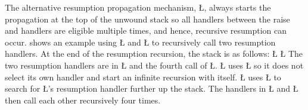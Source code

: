\documentclass[openright,twoside]{report}
\begin{document}
The alternative resumption propagation mechanism, \LGinlinetrue\LGbegin\lgrinde\L{}\endlgrinde\LGend{}, always starts the propagation at the top of the unwound stack so all handlers between the raise and handlers are eligible multiple times, and hence, recursive resumption can occur.
 shows an example using \LGinlinetrue\LGbegin\lgrinde\L{}\endlgrinde\LGend{} and \LGinlinetrue\LGbegin\lgrinde\L{}\endlgrinde\LGend{} to recursively call two resumption handlers.
At the end of the resumption recursion, the stack is as follows:
\LGinlinefalse\LGbegin\lgrinde
\L{}
\L{\LB{}}
\endlgrinde\LGend
The two resumption handlers are in \LGinlinetrue\LGbegin\lgrinde\L{}\endlgrinde\LGend{} and the fourth call of \LGinlinetrue\LGbegin\lgrinde\L{}\endlgrinde\LGend{}.
\LGinlinetrue\LGbegin\lgrinde\L{}\endlgrinde\LGend{} uses \LGinlinetrue\LGbegin\lgrinde\L{}\endlgrinde\LGend{} so it does not select its own handler and start an infinite recursion with itself.
\LGinlinetrue\LGbegin\lgrinde\L{}\endlgrinde\LGend{} uses \LGinlinetrue\LGbegin\lgrinde\L{}\endlgrinde\LGend{} to search for \LGinlinetrue\LGbegin\lgrinde\L{}\endlgrinde\LGend{}'s resumption handler further up the stack.
The handlers in \LGinlinetrue\LGbegin\lgrinde\L{}\endlgrinde\LGend{} and \LGinlinetrue\LGbegin\lgrinde\L{}\endlgrinde\LGend{} then call each other recursively four times.
\end{document}

